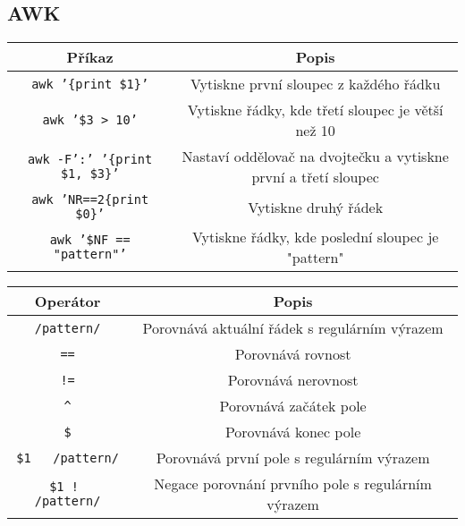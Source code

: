 \documentclass{article}
\begin{document}
\subsection{AWK}
\begin{center}
\begin{tabular}{|c|c|}
\hline
\textbf{Příkaz} & \textbf{Popis} \\
\hline
\texttt{awk '\{print \$1\}'} & Vytiskne první sloupec z každého řádku \\
\hline
\texttt{awk '\$3 > 10'} & Vytiskne řádky, kde třetí sloupec je větší než 10 \\
\hline
\texttt{awk -F':' '\{print \$1, \$3\}'} & Nastaví oddělovač na dvojtečku a vytiskne první a třetí sloupec \\
\hline
\texttt{awk 'NR==2\{print \$0\}'} & Vytiskne druhý řádek \\
\hline
\texttt{awk '\$NF == "pattern"'} & Vytiskne řádky, kde poslední sloupec je "pattern" \\
\hline
\end{tabular}
\end{center}

\begin{center}
\begin{tabular}{|c|c|}
\hline
\textbf{Operátor} & \textbf{Popis} \\
\hline
\texttt{/pattern/} & Porovnává aktuální řádek s regulárním výrazem \\
\texttt{==} & Porovnává rovnost \\
\hline
\texttt{!=} & Porovnává nerovnost \\
\hline
\texttt{\^} & Porovnává začátek pole \\
\hline
\texttt{\$} & Porovnává konec pole \\
\hline
\texttt{\$1 ~ /pattern/} & Porovnává první pole s regulárním výrazem \\
\hline
\texttt{\$1 !~ /pattern/} & Negace porovnání prvního pole s regulárním výrazem \\
\hline
\end{tabular}
\end{center}
\end{document}
